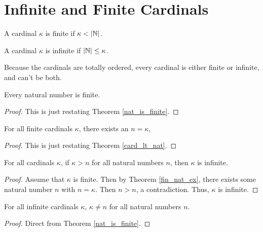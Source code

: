 \documentclass[../../math.tex]{subfiles}
\begin{document}
\section{Infinite and Finite Cardinals}

\begin{definition}
    A cardinal $\kappa$ is finite if $\kappa < |\mathbb{N}|$.
\end{definition}

\begin{definition}
    A cardinal $\kappa$ is infinite if $|\mathbb{N}| \leq \kappa$.
\end{definition}

Because the cardinals are totally ordered, every cardinal is either finite or
infinite, and can't be both.

\begin{theorem} \label{nat_is_finite}
    Every natural number is finite.
\end{theorem}
\begin{proof}
    This is just restating Theorem \ref{nat_is_finite}.
\end{proof}

\begin{theorem} \label{fin_nat_ex}
    For all finite cardinals $\kappa$, there exists an $n = \kappa$,
\end{theorem}
\begin{proof}
    This is just restating Theorem \ref{card_lt_nat}.
\end{proof}

\begin{theorem} \label{greater_all_nat_inf}
    For all cardinals $\kappa$, if $\kappa > n$ for all natural numbers $n$,
    then $\kappa$ is infinite.
\end{theorem}
\begin{proof}
    Assume that $\kappa$ is finite.  Then by Theorem \ref{fin_nat_ex}, there
    exists some natural number $n$ with $n = \kappa$.  Then $n > n$, a
    contradiction.  Thus, $\kappa$ is infinite.
\end{proof}

\begin{theorem} \label{inf_not_nat}
    For all infinite cardinals $\kappa$, $\kappa \neq n$ for all natural numbers
    $n$.
\end{theorem}
\begin{proof}
    Direct from Theorem \ref{nat_is_finite}.
\end{proof}
\end{document}
